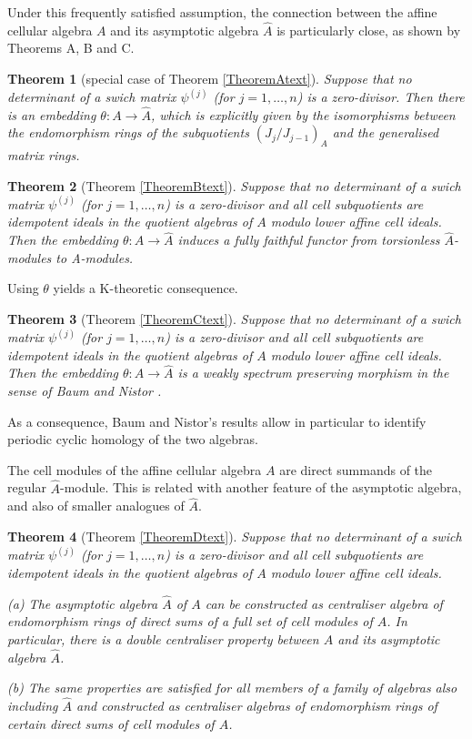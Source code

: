 \documentclass[oneside, a4paper, 11pt]{amsart}
\newtheorem{Theox}{Theorem}
\begin{document}
Under this frequently satisfied assumption, the connection between the
affine cellular algebra $A$ and its asymptotic algebra $\hat{A}$ is
particularly close, as shown by Theorems A, B and C.

\begin{Theox}[special case of Theorem \ref{TheoremAtext}]
  \label{TheoremA}
  Suppose that no determinant of a swich matrix $\psi^{(j)}$
  (for $j = 1, \dots, n$) is a zero-divisor.
  Then there is an embedding $\theta: A \rightarrow \hat{A}$, which is
  explicitly given by the isomorphisms between the endomorphism rings of
  the subquotients ${(J_j/J_{j-1})}_A$ and the generalised matrix rings. 
\end{Theox}

\begin{Theox}[Theorem \ref{TheoremBtext}]
\label{TheoremB}
Suppose that no determinant of a swich matrix $\psi^{(j)}$ (for $j = 1, \dots, n$)
is a zero-divisor and all cell subquotients are idempotent ideals in the
quotient algebras of $A$ modulo lower affine cell ideals. Then the embedding
$\theta: A \rightarrow \hat{A}$ induces a fully
faithful functor from torsionless $\hat{A}$-modules to A-modules.
\end{Theox}

Using $\theta$ yields a K-theoretic consequence. 

\begin{Theox}[Theorem \ref{TheoremCtext}]
\label{TheoremC}
Suppose that no determinant of a swich matrix $\psi^{(j)}$ (for $j = 1, \dots, n$)
is a zero-divisor and all cell subquotients are idempotent ideals in the
quotient algebras of $A$ modulo lower affine cell ideals. Then the
embedding $\theta: A \rightarrow \hat{A}$ is a weakly spectrum preserving
morphism in the sense of Baum and Nistor \cite{BN}.
\end{Theox}

As a consequence, Baum and Nistor's results allow in particular to identify
periodic cyclic homology of the two algebras. 
\medskip

The cell modules of the affine cellular algebra $A$ are direct summands of the
regular $\hat{A}$-module. This is related with another feature of the
asymptotic algebra, and also of smaller analogues of $\hat{A}$. 

\begin{Theox}[Theorem \ref{TheoremDtext}]
\label{TheoremD}
Suppose that no determinant of a swich matrix $\psi^{(j)}$ (for $j = 1, \dots, n$)
is a zero-divisor and all cell subquotients are idempotent ideals in the
quotient algebras of $A$ modulo lower affine cell ideals.

(a) The asymptotic algebra $\hat{A}$ of $A$ can be constructed as
centraliser algebra of endomorphism rings of direct sums of a full set
of cell modules of $A$. In particular, there is
a double centraliser property between $A$ and its asymptotic algebra $\hat{A}$.

(b) The same properties are satisfied for all members of a family of
algebras also including $\hat{A}$ and constructed as centraliser algebras
of endomorphism rings of certain direct sums of cell modules of $A$. 
\end{Theox}
\end{document}
